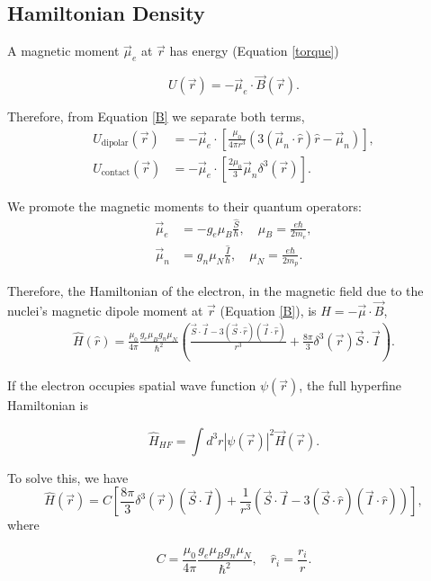 \documentclass[svgnames]{article}
\begin{document}
\subsection{Hamiltonian Density}

A magnetic moment $\vec{\mu}_e$ at $\vec{r}$ has energy (Equation \ref{torque})

\[
U(\vec{r}) = -\vec{\mu}_e \cdot \vec{B}(\vec{r}). 
\] 

Therefore, from Equation \ref{B} we separate both terms, 
\begin{align*}
    U_\text{dipolar}(\vec{r}) &= -\vec{\mu}_e \cdot \left[\frac{\mu_0}{4\pi r^3}
    (3(\vec{\mu}_n \cdot \hat{r}) \hat{r} - \vec{\mu}_n)\right], \\
        U_\text{contact}(\vec{r}) &= -\vec{\mu}_e \cdot \left[
        \frac{2\mu_0}{3}\vec{\mu}_n \delta^3(\vec{r}) \right]. 
\end{align*}

We promote the magnetic moments to their quantum operators: 
\begin{align*}
    \vec{\mu}_e &= -g_e \mu_B \frac{\hat{S}}{\hbar}, \quad \mu_B =
    \frac{e\hbar}{2m_e}, \\
    \vec{\mu}_n &= g_n \mu_N \frac{\hat{I}}{\hbar}, \quad \mu_N =
    \frac{e\hbar}{2m_p}. 
\end{align*}

Therefore, the Hamiltonian of the electron, in the magnetic field due to the
nuclei's magnetic dipole moment at $\vec{r}$ (Equation \ref{B}), is $H = -\vec{\mu} \cdot \vec{B}$,
\begin{align} \label{HF_Density}
    \hat{H}(\hat{r}) = \frac{\mu_0}{4\pi} \frac{g_e\mu_B g_n \mu_N}{\hbar^2} \left(
    \frac{\vec{S} \cdot \vec{I} - 3(\vec{S} \cdot \hat{r})(\vec{I}\cdot
\hat{r})}{r^3} + \frac{8\pi}{3}\delta^3(\vec{r})\vec{S}\cdot \vec{I}\right).   
\end{align}


If the electron occupies spatial wave function $\psi(\vec{r})$, the full
hyperfine Hamiltonian is 

\[
    \hat{H}_{HF} = \int d^3r |\psi(\vec{r})|^2 \vec{H}(\vec{r}).
\] 

To solve this, we have 
\[ \hat{H}(\vec{r}) = C\left[ \frac{8\pi}{3}
        \delta^3(\vec{r})(\vec{S}\cdot\vec{I}) +
        \frac{1}{r^3}(\vec{S}\cdot\vec{I} - 3(\vec{S}\cdot
    \hat{r})(\vec{I}\cdot \hat{r}))\right], 
\]
where 

\[
C = \frac{\mu_0}{4\pi}\frac{g_e\mu_B g_n \mu_N}{\hbar^2}, \quad \hat{r}_i =
\frac{r_i}{r}. 
\]\vspace{3px} 
\end{document}
